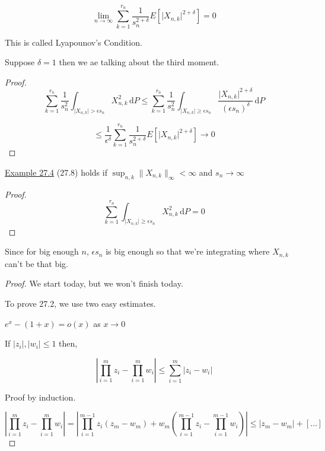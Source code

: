 \documentclass{article}
\theoremstyle{definition}
\begin{document}
\[
    \lim_{n \to \infty} \sum_{k=1}^{r_n} \frac{1}{s_n^{2+\delta}} E[\vert X_{n,k} \vert ^{2+\delta}] = 0
\]

This is called Lyapounov's Condition.

Suppose \(\delta = 1\) then we ae talking about the third moment.

\begin{proof}
    \[
        \sum_{k=1}^{r_n} \frac{1}{s_n^2} \int_{\vert X_{n,k} \vert > \epsilon s_n}^{} X_{n,k}^2 \,\mathrm{d}P \leq \sum_{k=1}^{r_n} \frac{1}{s_n^2} \int_{\vert X_{n,k} \vert \geq \epsilon s_n}^{} \frac{\vert X_{n,k} \vert ^{2+\delta}}{(\epsilon s_n)^\delta} \,\mathrm{d}P 
    \]

    \[
        \leq \frac{1}{\epsilon^\delta} \sum_{k=1}^{r_n} \frac{1}{s_n^{2+\delta}}E[\vert X_{n,k} \vert ^{2+\delta}] \to 0
    \]

\end{proof}

\underline{Example 27.4} (27.8) holds if \(\sup_{n,k} \lVert X_{n,k} \rVert _{\infty} < \infty\) and \(s_n \to \infty\) 

\begin{proof}
    \[
        \sum_{k=1}^{r_n} \int_{\vert X_{n,k} \vert \geq \epsilon s_n}^{} X_{n,k}^2 \,\mathrm{d}P = 0 
    \]
\end{proof}

Since for big enough \(n\), \(\epsilon s_n\) is big enough so that we're integrating where \(X_{n,k}\) can't be that big.

\begin{proof}
    We start today, but we won't finish today.

    To prove 27.2, we use two easy estimates.

    \(e^x - (1+x) = o(x)\) as \(x \to 0\) 

    If \(\vert z_i \vert , \vert w_i \vert \leq 1\) then,

    \[
        \left\vert \prod_{i=1}^{m} z_i - \prod_{i=1}^{m} w_i  \right\vert \leq \sum_{i=1}^{m} \vert z_i - w_i \vert 
    \]
    
    Proof by induction.

    \[
        \left\vert \prod_{i=1}^{m} z_i - \prod_{i=1}^{m} w_i  \right\vert = \left\vert \prod_{i=1}^{m-1} z_i(z_m - w_m) + w_m \left( \prod_{i=1}^{m-1} z_i - \prod_{i=1}^{m-1} w_i \right)  \right\vert \leq \vert z_m - w_m \vert + [\dots]
    \]

\end{proof}
\end{document}
